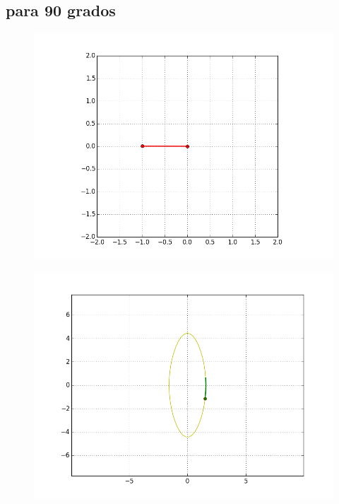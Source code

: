 \documentclass[12pt]{article}
\begin{document}
\subsection{para 90 grados}
\begin{figure}[H]
\includegraphics[scale=.6]{90p}
\end{figure}
\begin{figure}[H]
\includegraphics[scale=.6]{90e}
\end{figure}
\end{document}
